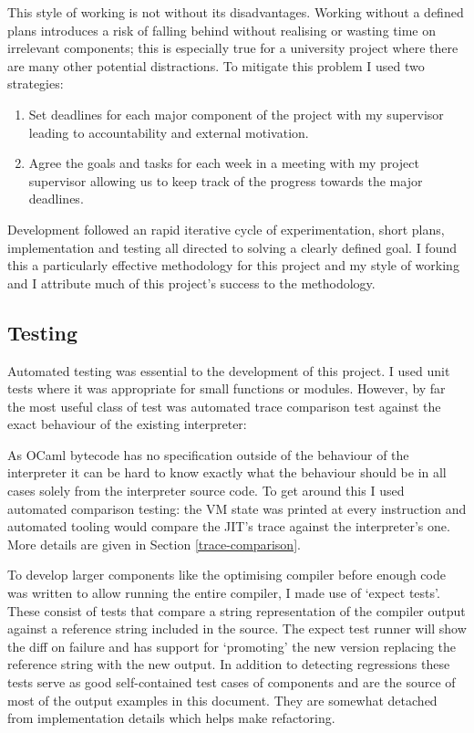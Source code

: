 This style of working is not without its disadvantages. Working without a defined plans introduces
a risk of falling behind without realising or wasting time on irrelevant components; this is
especially true for a university project where there are many other potential distractions. To
mitigate
this problem I used two strategies:

\begin{enumerate}
    \item Set deadlines for each major component of the project with my supervisor leading to
          accountability and external motivation.
    \item Agree the goals and tasks for each week in a meeting with my project supervisor
          allowing us to keep track of the progress towards the major deadlines.
\end{enumerate}

Development followed an rapid iterative cycle of experimentation, short plans, implementation and
testing all directed to solving a clearly defined goal. I found this a particularly effective
methodology for this project and my style of working and I attribute much of this project's success
to the methodology.

\subsection{Testing}

Automated testing was essential to the development of this project. I used unit tests where it was
appropriate for small functions or modules. However, by far the most useful class of test was
automated trace comparison test against the exact behaviour of the existing interpreter:

As OCaml bytecode has no specification outside of the behaviour of the interpreter it can be hard
to know exactly what the behaviour should be in all cases solely from the interpreter source code.
To get around this I used automated comparison testing: the VM state was printed at every
instruction and automated
tooling would compare the JIT's trace against the interpreter's one. More details are given in
Section \ref{trace-comparison}.

To develop larger components like the optimising compiler before enough code was written to allow
running the entire compiler, I made use of `expect tests'. These consist of tests that compare a
string representation of the compiler output against a reference string included in the source. The
expect test runner will show the diff on failure and has support for `promoting' the new version
replacing the reference string with the new output. In addition to detecting regressions these
tests
serve as good self-contained test cases of components and are the source of most of the output
examples in this document. They are somewhat detached from implementation details which helps make
refactoring.

